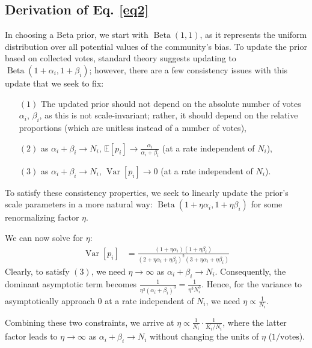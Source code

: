 \documentclass[chi_draft]{sigchi}
\begin{document}
\subsection{Derivation of Eq. \eqref{eq2}}
In choosing a Beta prior, we start with $\operatorname{Beta}(1,1)$, as it represents the uniform distribution over all potential values of the community's bias.  To update the prior based on collected votes, standard theory suggests updating to $\operatorname{Beta}(1+\alpha_i,1+\beta_i)$; however, there are a few consistency issues with this update that we seek to fix:
\begin{description}
\begin{itemize}
\item[$(1)$] The updated prior should not depend on the absolute number of votes $\alpha_i$, $\beta_i$, as this is not scale-invariant; rather, it should depend on the relative proportions (which are unitless instead of a number of votes),
\item[$(2)$] as $\alpha_i + \beta_i \rightarrow N_i$, $\mathbb{E}[p_i] \rightarrow \frac{\alpha_i}{\alpha_i+\beta_i}$ (at a rate independent of $N_i$),
\item[$(3)$] as $\alpha_i + \beta_i \rightarrow N_i$, $\operatorname{Var}[p_i] \rightarrow 0$ (at a rate independent of $N_i$).
\end{itemize}
\end{description}
To satisfy these consistency properties, we seek to linearly update the prior's scale parameters in a more natural way: $\operatorname{Beta}(1+\eta\alpha_i,1+\eta\beta_i)$ for some renormalizing factor $\eta$.

We can now solve for $\eta$:
\begin{align*}
\operatorname{Var}[p_i] &= \frac{(1+\eta\alpha_i)(1+\eta\beta_i)}{(2+\eta\alpha_i+\eta\beta_i)^2(3+\eta\alpha_i+\eta\beta_i)}
\end{align*}
Clearly, to satisfy $(3)$, we need $\eta \rightarrow \infty$ as $\alpha_i + \beta_i \rightarrow N_i$.  Consequently, the dominant asymptotic term becomes $\frac{1}{\eta^3 (\alpha_i + \beta_i)^3} = \frac{1}{\eta^3 N_i^3}$.  Hence, for the variance to asymptotically approach $0$ at a rate independent of $N_i$, we need $\eta \propto \frac{1}{N_i}$.

Combining these two constraints, we arrive at $\eta \propto \frac{1}{N_i}\cdot \frac{1}{K_i/N_i}$, where the latter factor leads to $\eta \rightarrow \infty$ as $\alpha_i + \beta_i \rightarrow N_i$ without changing the units of $\eta$ ($1/\text{votes}$).
\end{document}
